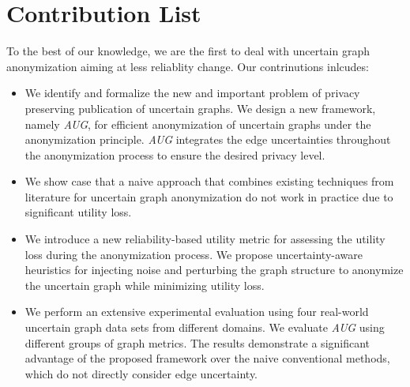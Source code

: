 \section{Contribution List}
To the best of our knowledge, we are the first to deal with uncertain graph anonymization aiming at less reliablity change. Our contrinutions inlcudes:
\begin{itemize}
\itemsep0em 
\item{We identify and formalize the new and important problem of privacy preserving publication of uncertain graphs.
	We design a new framework, namely {\em AUG}, for efficient anonymization of uncertain graphs under the {\keobf} anonymization principle. 
	{\em AUG} integrates the edge uncertainties throughout the anonymization process to ensure the desired privacy level.}

\item{We show case that a naive approach that combines existing techniques from literature for uncertain graph 		anonymization do not work in practice due to significant utility loss. 
}

\item{We introduce a new reliability-based utility metric for assessing the utility loss during the anonymization process. We propose uncertainty-aware heuristics for injecting noise and perturbing the graph structure to anonymize the uncertain graph while minimizing utility loss.}	
	
\item{
We perform an extensive experimental evaluation using four real-world uncertain graph data sets from different  domains. We evaluate {\em AUG} using different groups of graph metrics. The results demonstrate a significant advantage of the proposed framework over the naive conventional methods, which do not directly consider edge uncertainty. 
}
\end{itemize}